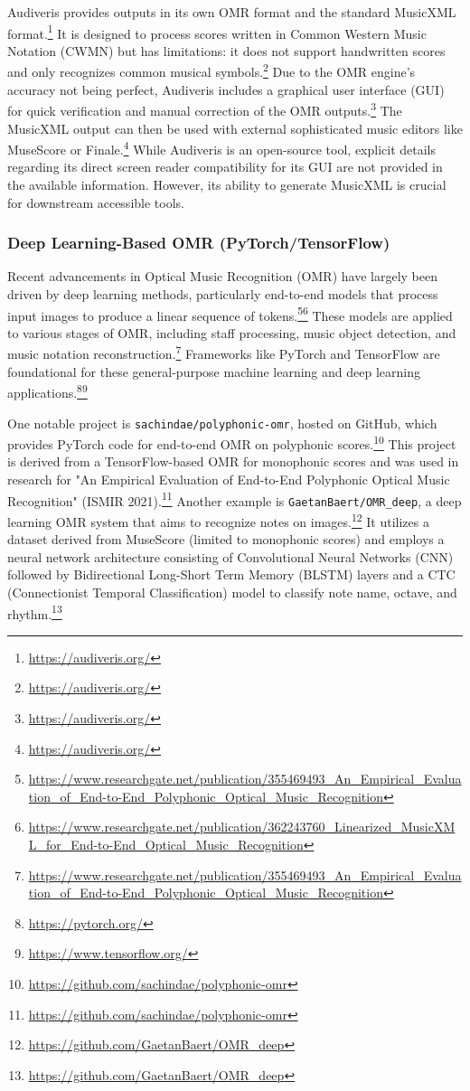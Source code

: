 Audiveris provides outputs in its own OMR format and the standard MusicXML format.\footnote{\url{https://audiveris.org/}} It is designed to process scores written in Common Western Music Notation (CWMN) but has limitations: it does not support handwritten scores and only recognizes common musical symbols.\footnote{\url{https://audiveris.org/}} Due to the OMR engine's accuracy not being perfect, Audiveris includes a graphical user interface (GUI) for quick verification and manual correction of the OMR outputs.\footnote{\url{https://audiveris.org/}} The MusicXML output can then be used with external sophisticated music editors like MuseScore or Finale.\footnote{\url{https://audiveris.org/}} While Audiveris is an open-source tool, explicit details regarding its direct screen reader compatibility for its GUI are not provided in the available information. However, its ability to generate MusicXML is crucial for downstream accessible tools.

\subsubsection{Deep Learning-Based OMR (PyTorch/TensorFlow)}
Recent advancements in Optical Music Recognition (OMR) have largely been driven by deep learning methods, particularly end-to-end models that process input images to produce a linear sequence of tokens.\footnote{\url{https://www.researchgate.net/publication/355469493_An_Empirical_Evaluation_of_End-to-End_Polyphonic_Optical_Music_Recognition}}\footnote{\url{https://www.researchgate.net/publication/362243760_Linearized_MusicXML_for_End-to-End_Optical_Music_Recognition}} These models are applied to various stages of OMR, including staff processing, music object detection, and music notation reconstruction.\footnote{\url{https://www.researchgate.net/publication/355469493_An_Empirical_Evaluation_of_End-to-End_Polyphonic_Optical_Music_Recognition}} Frameworks like PyTorch and TensorFlow are foundational for these general-purpose machine learning and deep learning applications.\footnote{\url{https://pytorch.org/}}\footnote{\url{https://www.tensorflow.org/}}

One notable project is \texttt{sachindae/polyphonic-omr}, hosted on GitHub, which provides PyTorch code for end-to-end OMR on polyphonic scores.\footnote{\url{https://github.com/sachindae/polyphonic-omr}} This project is derived from a TensorFlow-based OMR for monophonic scores and was used in research for "An Empirical Evaluation of End-to-End Polyphonic Optical Music Recognition" (ISMIR 2021).\footnote{\url{https://github.com/sachindae/polyphonic-omr}} Another example is \texttt{GaetanBaert/OMR\_deep}, a deep learning OMR system that aims to recognize notes on images.\footnote{\url{https://github.com/GaetanBaert/OMR_deep}} It utilizes a dataset derived from MuseScore (limited to monophonic scores) and employs a neural network architecture consisting of Convolutional Neural Networks (CNN) followed by Bidirectional Long-Short Term Memory (BLSTM) layers and a CTC (Connectionist Temporal Classification) model to classify note name, octave, and rhythm.\footnote{\url{https://github.com/GaetanBaert/OMR_deep}}

